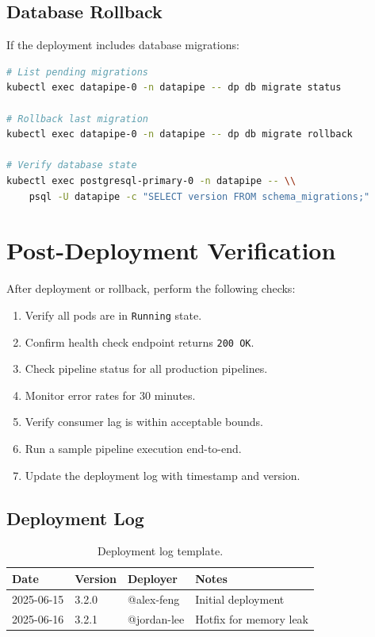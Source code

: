 \documentclass[
    language=english,
    doctype=manual,
    institution=none,
    titlestyle=book,
    oneside,
]{../../omnilatex}
\begin{document}
\section{Database Rollback}

If the deployment includes database migrations:

\begin{lstlisting}[language=bash, caption={Database migration rollback.}]
# List pending migrations
kubectl exec datapipe-0 -n datapipe -- dp db migrate status

# Rollback last migration
kubectl exec datapipe-0 -n datapipe -- dp db migrate rollback

# Verify database state
kubectl exec postgresql-primary-0 -n datapipe -- \\
    psql -U datapipe -c "SELECT version FROM schema_migrations;"
\end{lstlisting}

\chapter{Post-Deployment Verification}
\label{sec:post-deployment}

After deployment or rollback, perform the following checks:

\begin{enumerate}
    \item Verify all pods are in \texttt{Running} state.
    \item Confirm health check endpoint returns \texttt{200 OK}.
    \item Check pipeline status for all production pipelines.
    \item Monitor error rates for 30 minutes.
    \item Verify consumer lag is within acceptable bounds.
    \item Run a sample pipeline execution end-to-end.
    \item Update the deployment log with timestamp and version.
\end{enumerate}

\section{Deployment Log}

\begin{table}[htbp]
    \centering
    \caption{Deployment log template.}
    \label{tab:deploy-log}
    \begin{tabular}{@{}llll@{}}
        \toprule
        Date & Version & Deployer & Notes \\
        \midrule
        2025-06-15 & 3.2.0 & @alex-feng & Initial deployment \\
        2025-06-16 & 3.2.1 & @jordan-lee & Hotfix for memory leak \\
        \bottomrule
    \end{tabular}
\end{table}

\printbibliography[heading=bibintoc, title={References}]
\end{document}
